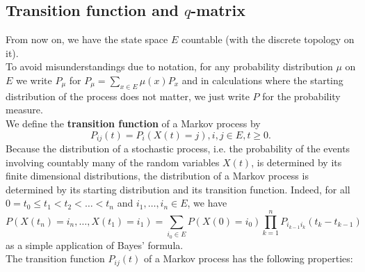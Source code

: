 \documentclass[12pt,a4paper]{scrartcl}
\numberwithin{equation}{section}
\begin{document}
\subsection{Transition function and $q$-matrix}

From now on, we have the state space $E$ countable (with the discrete topology on it).\\[2ex]

To avoid misunderstandings due to notation, for any probability distribution $\mu$ on $E$ we write $P_{\mu}$ for $P_{\mu} = \sum_{x \in E} \mu\left(x\right) P_x$ and in calculations where the starting distribution of the process does not matter, we just write $P$ for the probability measure.\\[2ex]

We define the \textbf{transition function} of a Markov process by
\begin{equation}
P_{ij}\left(t\right) = P_i\left(X\left(t\right)=j \right), i,j \in E, t\geq 0. 
\end{equation}
Because the distribution of a stochastic process, i.e. the probability of the events involving countably many of the random variables $ X\left(t\right) $, is determined by its finite dimensional distributions, the distribution of a Markov process is determined by its starting distribution and its transition function. Indeed, for all $ 0 = t_0 \leq t_1 < t_2 < \ldots < t_n $ and $ i_1,\ldots,i_n \in E$, we have 
$$ P\left(X\left(t_n\right) = i_n, \ldots, X\left(t_1\right) = i_1\right) = \sum_{i_0 \in E} P\left(X\left(0\right) = i_0 \right) \prod_{k=1}^{n} P_{i_{k-1}i_k}\left(t_k - t_{k-1}\right) $$
as a simple application of Bayes' formula.\\



The transition function $P_{ij}\left(t\right)$ of a Markov process has the following properties:
\end{document}
